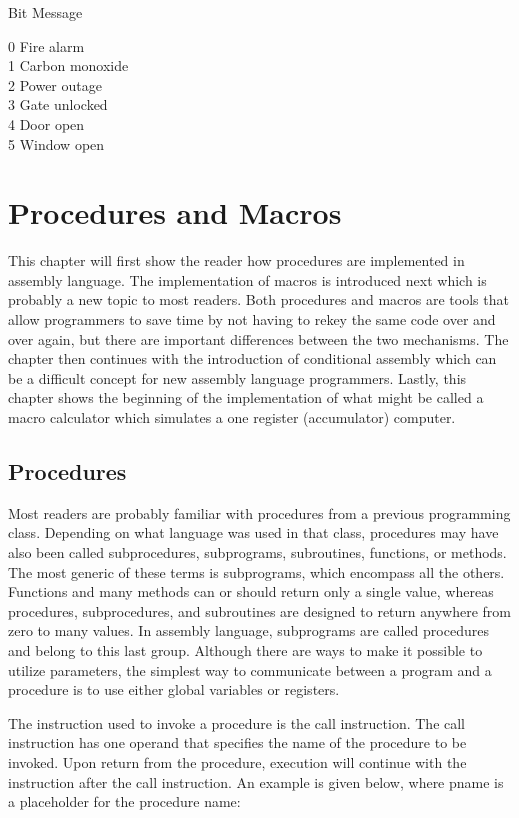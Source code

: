 \documentclass[10pt]{book}
\begin{document}
Bit Message

0 Fire alarm\\
1 Carbon monoxide\\
2 Power outage\\
3 Gate unlocked\\
4 Door open\\
5 Window open

\chapter{Procedures and Macros}

This chapter will first show the reader how procedures are implemented in assembly language. The implementation of macros is introduced next which is probably a new topic to most readers. Both procedures and macros are tools that allow programmers to save time by not having to rekey the same code over and over again, but there are important differences between the two mechanisms. The chapter then continues with the introduction of conditional assembly which can be a difficult concept for new assembly language programmers. Lastly, this chapter shows the beginning of the implementation of what might be called a macro calculator which simulates a one register (accumulator) computer.

\section{Procedures}
Most readers are probably familiar with procedures from a previous programming class. Depending on what language was used in that class, procedures may have also been called subprocedures, subprograms, subroutines, functions, or methods. The most generic of these terms is subprograms, which encompass all the others. Functions and many methods can or should return only a single value, whereas procedures, subprocedures, and subroutines are designed to return anywhere from zero to many values. In assembly language, subprograms are called procedures and belong to this last group. Although there are ways to make it possible to utilize parameters, the simplest way to communicate between a program and a procedure is to use either global variables or registers.

The instruction used to invoke a procedure is the call instruction. The call instruction has one operand that specifies the name of the procedure to be invoked. Upon return from the procedure, execution will continue with the instruction after the call instruction. An example is given below, where pname is a placeholder for the procedure name:
\end{document}

